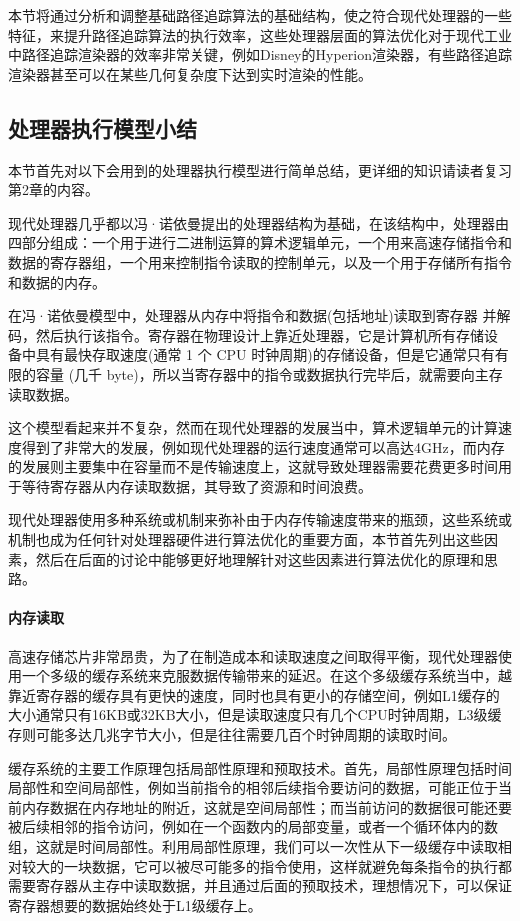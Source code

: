 本节将通过分析和调整基础路径追踪算法的基础结构，使之符合现代处理器的一些特征，来提升路径追踪算法的执行效率，这些处理器层面的算法优化对于现代工业中路径追踪渲染器的效率非常关键，例如Disney的Hyperion渲染器，有些路径追踪渲染器甚至可以在某些几何复杂度下达到实时渲染的性能。






\subsection{处理器执行模型小结}
本节首先对以下会用到的处理器执行模型进行简单总结，更详细的知识请读者复习第2章的内容。

现代处理器几乎都以冯·诺依曼提出的处理器结构为基础，在该结构中，处理器由四部分组成：一个用于进行二进制运算的算术逻辑单元，一个用来高速存储指令和数据的寄存器组，一个用来控制指令读取的控制单元，以及一个用于存储所有指令和数据的内存。

在冯·诺依曼模型中，处理器从内存中将指令和数据(包括地址)读取到寄存器 并解码，然后执行该指令。寄存器在物理设计上靠近处理器，它是计算机所有存储设 备中具有最快存取速度(通常 1 个 CPU 时钟周期)的存储设备，但是它通常只有有 限的容量 (几千 byte)，所以当寄存器中的指令或数据执行完毕后，就需要向主存读取数据。

这个模型看起来并不复杂，然而在现代处理器的发展当中，算术逻辑单元的计算速度得到了非常大的发展，例如现代处理器的运行速度通常可以高达4GHz，而内存的发展则主要集中在容量而不是传输速度上，这就导致处理器需要花费更多时间用于等待寄存器从内存读取数据，其导致了资源和时间浪费。

现代处理器使用多种系统或机制来弥补由于内存传输速度带来的瓶颈，这些系统或机制也成为任何针对处理器硬件进行算法优化的重要方面，本节首先列出这些因素，然后在后面的讨论中能够更好地理解针对这些因素进行算法优化的原理和思路。




\paragraph{内存读取}
高速存储芯片非常昂贵，为了在制造成本和读取速度之间取得平衡，现代处理器使用一个多级的缓存系统来克服数据传输带来的延迟。在这个多级缓存系统当中，越靠近寄存器的缓存具有更快的速度，同时也具有更小的存储空间，例如L1缓存的大小通常只有16KB或32KB大小，但是读取速度只有几个CPU时钟周期，L3级缓存则可能多达几兆字节大小，但是往往需要几百个时钟周期的读取时间。

缓存系统的主要工作原理包括局部性原理和预取技术。首先，局部性原理包括时间局部性和空间局部性，例如当前指令的相邻后续指令要访问的数据，可能正位于当前内存数据在内存地址的附近，这就是空间局部性；而当前访问的数据很可能还要被后续相邻的指令访问，例如在一个函数内的局部变量，或者一个循环体内的数组，这就是时间局部性。利用局部性原理，我们可以一次性从下一级缓存中读取相对较大的一块数据，它可以被尽可能多的指令使用，这样就避免每条指令的执行都需要寄存器从主存中读取数据，并且通过后面的预取技术，理想情况下，可以保证寄存器想要的数据始终处于L1级缓存上。

